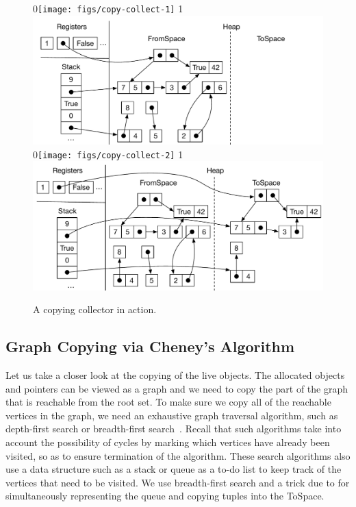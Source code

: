 \documentclass[7x10,nocrop]{TimesAPriori_MIT}%
\def\racketEd{0}
\def\pythonEd{1}
\def\edition{0}
\newcommand{\racket}[1]{{\if\edition\racketEd{#1}\fi}}
\newcommand{\python}[1]{{\if\edition\pythonEd #1\fi}}
\begin{document}
\begin{figure}[tbp]
\centering
\racket{\texttt{[image: figs/copy-collect-1]}}
\python{\includegraphics[width=\textwidth]{figs/copy-collect-1-python}}
\\[5ex]
\racket{\texttt{[image: figs/copy-collect-2]}}
\python{\includegraphics[width=\textwidth]{figs/copy-collect-2-python}}
\caption{A copying collector in action.}
\label{fig:copying-collector}
\end{figure}

\subsection{Graph Copying via Cheney's Algorithm}
\label{sec:cheney}
Let us take a closer look at the copying of the live objects. The
allocated objects and pointers can be viewed as a graph and we need to
copy the part of the graph that is reachable from the root set. To
make sure we copy all of the reachable vertices in the graph, we need
an exhaustive graph traversal algorithm, such as depth-first search or
breadth-first search~\citep{Moore:1959aa,Cormen:2001uq}. Recall that
such algorithms take into account the possibility of cycles by marking
which vertices have already been visited, so as to ensure termination
of the algorithm. These search algorithms also use a data structure
such as a stack or queue as a to-do list to keep track of the vertices
that need to be visited. We use breadth-first search and a trick
due to \citet{Cheney:1970aa} for simultaneously representing the queue
and copying tuples into the ToSpace.
\end{document}
